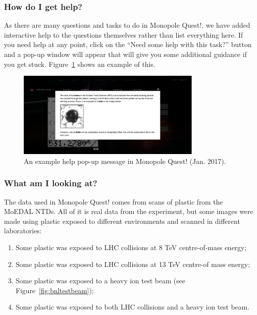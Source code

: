 \subsubsection{How do I get help?}
\label{sec:mqhelp}
As there are many questions and tasks to do in Monopole Quest!,
we have added interactive help to the questions themselves rather than
list everything here.  If you need help at any point, click on the
``Need some help with this task?'' button and a pop-up window will appear
that will give you some additional guidance if you get stuck.
Figure~\ref{fig:mqhelp} shows an example of this.

%
\begin{figure}[htbp]
  \centering
  \includegraphics[width=0.8\textwidth]{assets/images/mqhelp/mqhelp.png}
  \caption[Monopole Quest! An example help message]
  {\label{fig:mqhelp}An example help pop-up message in Monopole Quest! (Jan. 2017).}
\end{figure}
%

\clearpage

\subsubsection{What am I looking at?}
\label{sec:mqlookingat}
The data used in Monopole Quest! comes from scans of plastic from the
\ac{MoEDAL} \acp{NTD}.
All of it is real data from the experiment,
but some images were made using plastic exposed to different environments
and scanned in different laboratories:

\begin{enumerate}
\item Some plastic was exposed to LHC collisions at 8 TeV centre-of-mass energy;
\item Some plastic was exposed to LHC collisions at 13 TeV centre-of mass energy;
\item Some plastic was exposed to a heavy ion test beam
(see Figure~\ref{fig:bnltestbeam});
\item Some plastic was exposed to both LHC collisions and a heavy ion test beam.
\end{enumerate}

